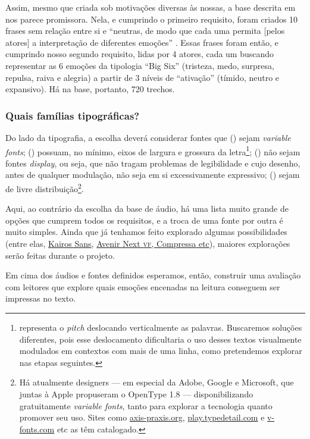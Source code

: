 \documentclass[a4paper,11pt,titlepage,singlespacing]{article}
\newcommand{\num}[1]{(\oldstylenums{#1})}
\begin{document}
Assim, mesmo que criada sob motivações diversas às nossas, a base descrita em  nos parece promissora. Nela, e cumprindo o primeiro requisito, foram criados 10 frases sem relação entre si e ``neutras, de modo que cada uma permita [pelos atores] a interpretação de diferentes emoções'' \cite[p.50]{pdpcosta2015}. Essas frases foram então, e cumprindo nosso segundo requisito, lidas por 4 atores, cada um buscando representar as 6 emoções da tipologia ``Big Six'' (tristeza, medo, surpresa, repulsa, raiva e alegria) a partir de 3 níveis de ``ativação'' (tímido, neutro e expansivo). Há na base, portanto, 720 trechos.


\subsubsection*{Quais famílias tipográficas?}

Do lado da tipografia, a escolha deverá considerar fontes que \num{1} sejam \textit{variable fonts}; \num{2} possuam, no mínimo, eixos de largura e grossura da letra\footnote{ representa o \textit{pitch} deslocando verticalmente as palavras. Buscaremos soluções diferentes, pois esse deslocamento dificultaria o uso desses textos visualmente modulados em contextos com mais de uma linha, como pretendemos explorar nas etapas seguintes.}; \num{3} não sejam fontes \textit{display}, ou seja, que não tragam problemas de legibilidade e cujo desenho, antes de qualquer modulação, não seja em si excessivamente expressivo; \num{4} sejam de livre distribuição\footnote{Há atualmente designers — em especial da Adobe, Google e Microsoft, que juntas à Apple propuseram o OpenType 1.8 — disponibilizando gratuitamente \textit{variable fonts}, tanto para explorar a tecnologia quanto promover seu uso. Sites como \url{axis-praxis.org}, \url{play.typedetail.com} e \url{v-fonts.com} etc as têm catalogado.}.

Aqui, ao contrário da escolha da base de áudio, há uma lista muito grande de opções que cumprem todos os requisitos, e a troca de uma fonte por outra é muito simples. Ainda que já tenhamos feito explorado algumas possibilidades (entre elas, \href{https://www.axis-praxis.org/specimens/kairos-sans}{Kairos Sans}, \href{https://www.axis-praxis.org/specimens/avenir-next}{Avenir Next \textsc{vf}, \href{https://www.axis-praxis.org/specimens/compressa}{Compressa} etc}), maiores explorações serão feitas durante o projeto.

Em cima dos áudios e fontes definidos esperamos, então, construir uma avaliação com leitores que explore quais emoções encenadas na leitura conseguem ser impressas no texto.
\end{document}
